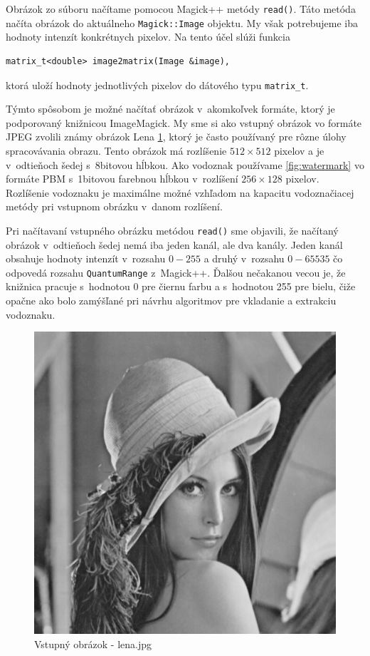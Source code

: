 Obrázok zo súboru načítame pomocou Magick++ metódy {\tt read()}. Táto metóda načíta obrázok do aktuálneho {\tt Magick::Image} objektu. My však potrebujeme iba hodnoty intenzít konkrétnych pixelov. Na tento účel slúži funkcia
\begin{lstlisting}
matrix_t<double> image2matrix(Image &image),
\end{lstlisting}
ktorá uloží hodnoty jednotlivých pixelov do dátového typu {\tt matrix\_t}.

Týmto spôsobom je možné načítať obrázok v~akomkoľvek formáte, ktorý je podporovaný knižnicou ImageMagick. My sme si ako vstupný obrázok vo formáte JPEG zvolili známy obrázok Lena \ref{fig:lena}, ktorý je často používaný pre rôzne úlohy spracovávania obrazu. Tento obrázok má rozlíšenie $512\times512$ pixelov a je v~odtieňoch šedej s~8bitovou hĺbkou. Ako vodoznak používame \ref{fig:watermark} vo formáte PBM s~1bitovou farebnou hĺbkou v~rozlíšení $256\times128$ pixelov. Rozlíšenie vodoznaku je maximálne možné vzhľadom na kapacitu vodoznačiacej metódy pri vstupnom obrázku v~danom rozlíšení.

Pri načítavaní vstupného obrázku metódou {\tt read()} sme objavili, že načítaný obrázok v~odtieňoch šedej nemá iba jeden kanál, ale dva kanály. Jeden kanál obsahuje hodnoty intenzít v~rozsahu $0 - 255$ a druhý v~rozsahu $0-65535$ čo odpovedá rozsahu {\tt QuantumRange} z~Magick++. Ďalšou nečakanou vecou je, že knižnica pracuje s~hodnotou 0 pre čiernu farbu a s~hodnotou 255 pre bielu, čiže opačne ako bolo zamýšľané pri návrhu algoritmov pre vkladanie a extrakciu vodoznaku.

\begin{figure}
    \centering
    \includegraphics[scale=0.5]{obrazky/lena}
    \caption{Vstupný obrázok - lena.jpg}
    \label{fig:lena}
\end{figure}

